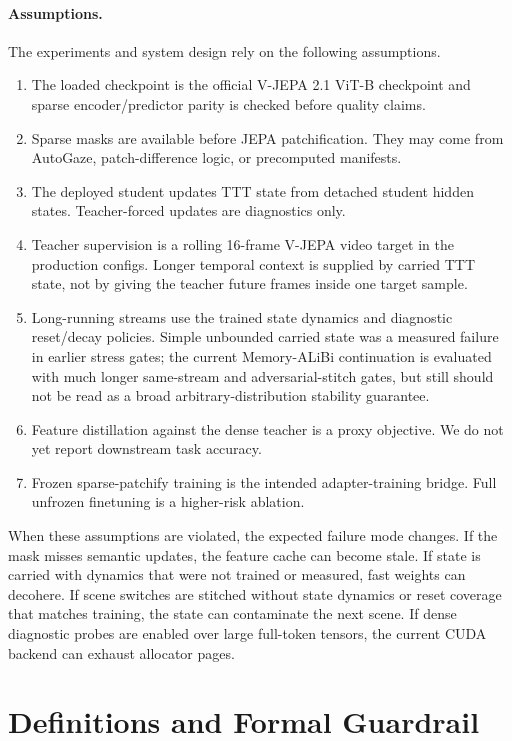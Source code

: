 \documentclass[10pt]{article}
\begin{document}
\paragraph{Assumptions.}
The experiments and system design rely on the following assumptions.
\begin{enumerate}
\item The loaded checkpoint is the official V-JEPA 2.1 ViT-B checkpoint and
  sparse encoder/predictor parity is checked before quality claims.
\item Sparse masks are available before JEPA patchification.  They may come
  from AutoGaze, patch-difference logic, or precomputed manifests.
\item The deployed student updates TTT state from detached student hidden
  states.  Teacher-forced updates are diagnostics only.
\item Teacher supervision is a rolling 16-frame V-JEPA video target in the
  production configs.  Longer temporal context is supplied by carried TTT state,
  not by giving the teacher future frames inside one target sample.
\item Long-running streams use the trained state dynamics and diagnostic
  reset/decay policies.  Simple unbounded carried state was a measured failure
  in earlier stress gates; the current Memory-ALiBi continuation is evaluated
  with much longer same-stream and adversarial-stitch gates, but still should
  not be read as a broad arbitrary-distribution stability guarantee.
\item Feature distillation against the dense teacher is a proxy objective.  We
  do not yet report downstream task accuracy.
\item Frozen sparse-patchify training is the intended adapter-training bridge.
  Full unfrozen finetuning is a higher-risk ablation.
\end{enumerate}

When these assumptions are violated, the expected failure mode changes.  If
the mask misses semantic updates, the feature cache can become stale.  If state
is carried with dynamics that were not trained or measured, fast weights can
decohere.  If scene switches are stitched without state dynamics or reset
coverage that matches training, the state can contaminate the next scene.  If
dense diagnostic probes are enabled over large full-token tensors, the current
CUDA backend can exhaust allocator pages.

\section{Definitions and Formal Guardrail}
\end{document}
